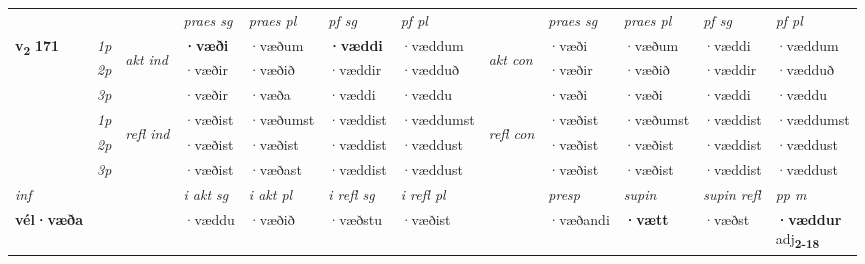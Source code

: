 \begin{longtable}[l]{X>{\footnotesize\itshape}llXXXXlXXXX}
 & &   & \textit{praes sg}  & \textit{praes pl}    & \textit{ pf sg} & \textit{pf pl} & & \textit{praes sg}  & \textit{praes pl}    & \textit{pf sg} & \textit{pf pl }  \\ \cmidrule{4-7} \cmidrule{9-12}
 \multirow{2}{*}{{{\textbf{v{\textsubscript{2}}} \Large{\textbf{171}}}}}  & 1p & \multirow{3}{*}{\begin{turn}{90}\textit{akt ind}\end{turn}} & \textbf{·væði} & ·væðum & \textbf{·væddi} & ·væddum & \multirow{3}{*}{\begin{turn}{90}\textit{akt con}\end{turn}} &·væði & ·væðum & ·væddi & ·væddum\\*
 & 2p &  &  ·væðir  & ·væðið & ·væddir & ·vædduð & & ·væðir & ·væðið & ·væddir & ·vædduð \\*
 & 3p &  & ·væðir & ·væða & ·væddi & ·væddu & & ·væði & ·væði& ·væddi & ·væddu \\*
\cmidrule{4-7} \cmidrule{9-12}
 & 1p & \multirow{3}{*}{\begin{turn}{90}\textit{refl ind}\end{turn}}  & ·væðist & ·væðumst & ·væddist & ·væddumst & \multirow{3}{*}{\begin{turn}{90}\textit{refl con}\end{turn}}  &·væðist & ·væðumst & ·væddist & ·væddumst \\*
 & 2p &  & ·væðist & ·væðist & ·væddist & ·væddust & &·væðist & ·væðist & ·væddist & ·væddust \\*
 & 3p  & & ·væðist & ·væðast & ·væddist & ·væddust & & ·væðist & ·væðist& ·væddist & ·væddust \\*
\cmidrule{4-7} \cmidrule{9-12}

   {\textit{inf}} & &  & \textit{i akt sg} & \textit{i akt pl} & \textit{i refl sg} & \textit{i refl pl} && \textit{presp} & \textit{supin} & \textit{supin refl} & \textit{pp m} \\*
  {\textbf{vél\allowbreak ·væða}} & && ·væddu  & ·væðið & ·væðstu & ·væðist && ·væðandi &  \textbf{·vætt} & ·væðst & \specialcell{\textbf{·væddur} \\ adj\textbf{\textsubscript{2-18}}} \\*

\midrule


\end{longtable}

